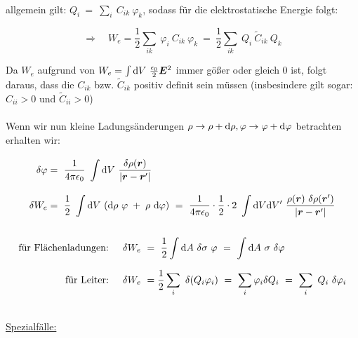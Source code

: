 \ \\
allgemein gilt: $Q_i \ = \ \sum_i \ C_{ik} \ \varphi_k$, sodass für die elektrostatische Energie folgt:


\begin{equation*}
\Rightarrow \quad W_e = \frac{1}{2} \sum_{ik} \ \varphi_i \ C_{ik} \ \varphi_k \ = 
\ \frac{1}{2} \sum_{ik} \ Q_i \ \tilde{C}_{ik} \ Q_k
\end{equation*}

Da $W_e$ aufgrund von $W_e = \int\d V \ \frac{\epsilon_0}{2} \vec{E}^2$ immer gößer oder gleich 0 ist, folgt daraus, dass die $C_{ik}$ bzw. $\tilde{C}_{ik}$ positiv definit sein müssen (insbesindere gilt sogar: $C_{ii} > 0$ und $\tilde{C}_{ii} > 0$)\\
\ \\

Wenn wir nun kleine Ladungsänderungen $\rho \rightarrow \rho +\mathrm{d} \rho, \varphi \rightarrow\varphi + \mathrm{d}\varphi$ betrachten erhalten wir:

\begin{align*}
\delta\varphi &= \ \frac{1}{4\pi\epsilon_0} \ \Int{}{}{V} \frac{\delta\rho(\vec{r})}{|\vec{r}-\vec{r}'|}\\
\delta W_e &= \ \frac{1}{2} \ \Int{}{}{V} (\d\rho \ \varphi \; + \; \rho \ \d\varphi) \ = \ \frac{1}{4\pi\epsilon_0} \cdot\frac{1}{2}\cdot 2 \ \int\d V \d V' \ \frac{\rho(\vec{r}) \ \delta\rho(\vec{r}')}{|\vec{r}-\vec{r}'|}
\end{align*}

\begin{align*}
\text{für Flächenladungen: } & \quad\delta W_e \ = \ \frac{1}{2}\Int{}{}{A}  \delta\sigma \ \varphi \ = \ \Int{}{}{A}  \sigma \ \delta\varphi\\
\text{für Leiter: } & \quad\delta W_e \ = \frac{1}{2}\sum_i \ \delta(Q_i\varphi_i) \ = \ \sum_i \varphi_i \delta Q_i \ = \ \sum_i \ Q_i \ \delta\varphi_i
\end{align*}

\ \\
\underline{Spezialfälle:}\\


